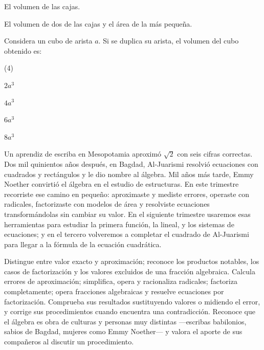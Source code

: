 \documentclass[11pt]{article}
\begin{document}
\begin{preguntas}
\begin{opciones}
  \item El volumen de las cajas.
  \item El volumen de dos de las cajas y el área de la más pequeña.
\end{opciones}
\pregunta Considera un cubo de arista $a$. Si se duplica su arista, el
volumen del cubo obtenido es:
\begin{opciones*}(4)
  \item $2a^3$
  \item $4a^3$
  \item $6a^3$
  \item $8a^3$
\end{opciones*}
\end{preguntas}


Un aprendiz de escriba en Mesopotamia aproximó $\sqrt{2}$ con seis cifras
correctas. Dos mil quinientos años después, en Bagdad, Al-Juarismi resolvió
ecuaciones con cuadrados y rectángulos y le dio nombre al álgebra. Mil años
más tarde, Emmy Noether convirtió el álgebra en el estudio de estructuras.
En este trimestre recorriste ese camino en pequeño: aproximaste y mediste
errores, operaste con radicales, factorizaste con modelos de área y
resolviste ecuaciones transformándolas sin cambiar su valor. En el siguiente
trimestre usaremos esas herramientas para estudiar la primera función, la
lineal, y los sistemas de ecuaciones; y en el tercero volveremos a completar
el cuadrado de Al-Juarismi para llegar a la fórmula de la ecuación
cuadrática.

\clearpage
\matrizevaluacion
  {Distingue entre valor exacto y aproximación; reconoce los productos
   notables, los casos de factorización y los valores excluidos de una
   fracción algebraica.}
  {Calcula errores de aproximación; simplifica, opera y racionaliza
   radicales; factoriza completamente; opera fracciones algebraicas y
   resuelve ecuaciones por factorización.}
  {Comprueba sus resultados sustituyendo valores o midiendo el error, y
   corrige sus procedimientos cuando encuentra una contradicción.}
  {Reconoce que el álgebra es obra de culturas y personas muy distintas
   —escribas babilonios, sabios de Bagdad, mujeres como Emmy Noether— y
   valora el aporte de sus compañeros al discutir un procedimiento.}
\end{document}
